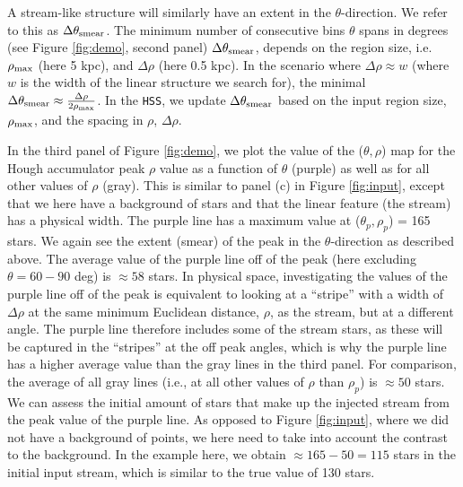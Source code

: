 \documentclass[twocolumn]{aastex631}
\begin{document}
A stream-like structure will similarly have an extent in the $\theta$-direction. We refer to this as $\Delta \theta_{\rm smear}$. The minimum number of consecutive bins $\theta$ spans in degrees (see Figure \ref{fig:demo}, second panel) $\Delta \theta_{\rm smear}$, depends on the region size, i.e. $\rho_{\rm max}$ (here 5 kpc), and $\Delta \rho$ (here 0.5 kpc). In the scenario where $\Delta \rho \approx w$ (where $w$ is the width of the linear structure we search for), the minimal $\Delta \theta_{\rm smear} \approx \frac{\Delta \rho}{2\rho_{\rm max}}$. 
In the \texttt{HSS}, we update $\Delta \theta_{\rm smear}$ based on the input region size, $\rho_{\rm max}$, and the spacing in $\rho$, $\Delta \rho$. 

In the third panel of Figure \ref{fig:demo}, we plot the value of the ($\theta,\rho$) map for the Hough accumulator peak $\rho$ value as a function of $\theta$ (purple) as well as for all other values of $\rho$ (gray). This is similar to panel (c) in Figure \ref{fig:input}, except that we here have a background of stars and that the linear feature (the stream) has a physical width. The purple line has a maximum value at ($\theta_p,\rho_p$) = 165 stars. We again see the extent (smear) of the peak in the $\theta$-direction as described above. 
The average value of the purple line off of the peak (here excluding $\theta = 60 - 90$ deg) is $\approx 58$ stars. In physical space, investigating the values of the purple line off of the peak is equivalent to looking at a ``stripe'' with a width of  $\Delta\rho$ at the same minimum Euclidean distance, $\rho$, as the stream, but at a different angle. The purple line therefore includes some of the stream stars, as these will be captured in the ``stripes'' at the off peak angles, which is why the purple line has a higher average value than the gray lines in the third panel. For comparison, the average of all gray lines (i.e., at all other values of $\rho$ than $\rho_p$) is $\approx 50$ stars. We can assess the initial amount of stars that make up the injected stream from the peak value of the purple line. As opposed to Figure \ref{fig:input}, where we did not have a background of points, we here need to take into account the contrast to the background. In the example here, we obtain $\approx 165 - 50 = 115$ stars in the initial input stream, which is similar to the true value of 130 stars. 
\end{document}
